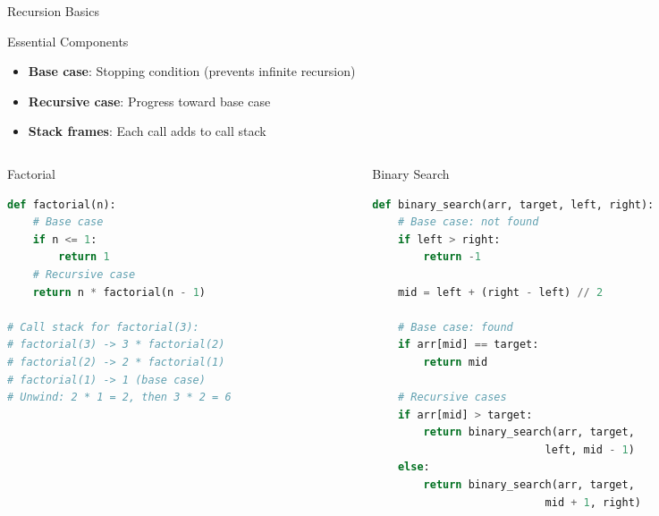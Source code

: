 \documentclass[aspectratio=169,xcolor=dvipsnames]{beamer}
\begin{document}
\begin{frame}[fragile]{Recursion Basics}
  \begin{block}{Essential Components}
    \begin{itemize}
      \item \textbf{Base case}: Stopping condition (prevents infinite recursion)
      \item \textbf{Recursive case}: Progress toward base case
      \item \textbf{Stack frames}: Each call adds to call stack
    \end{itemize}
  \end{block}

  \vspace{0.3cm}

  \begin{columns}
    \begin{column}{0.48\textwidth}
      \begin{exampleblock}{Factorial}
        \begin{lstlisting}[language=Python,basicstyle=\tiny\ttfamily]
def factorial(n):
    # Base case
    if n <= 1:
        return 1
    # Recursive case
    return n * factorial(n - 1)

# Call stack for factorial(3):
# factorial(3) -> 3 * factorial(2)
# factorial(2) -> 2 * factorial(1)
# factorial(1) -> 1 (base case)
# Unwind: 2 * 1 = 2, then 3 * 2 = 6
        \end{lstlisting}
      \end{exampleblock}
    \end{column}
    \begin{column}{0.48\textwidth}
      \begin{exampleblock}{Binary Search}
        \begin{lstlisting}[language=Python,basicstyle=\tiny\ttfamily]
def binary_search(arr, target, left, right):
    # Base case: not found
    if left > right:
        return -1

    mid = left + (right - left) // 2

    # Base case: found
    if arr[mid] == target:
        return mid

    # Recursive cases
    if arr[mid] > target:
        return binary_search(arr, target,
                           left, mid - 1)
    else:
        return binary_search(arr, target,
                           mid + 1, right)
        \end{lstlisting}
      \end{exampleblock}
    \end{column}
  \end{columns}
\end{frame}
\end{document}

